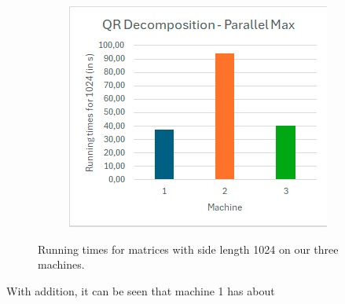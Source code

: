 \begin{figure}[ht]
\begin{subfigure}[b]{0.32\textwidth}
         \label{fig:multiplication diagram}
     \end{subfigure}
     \hfill
     \begin{subfigure}[b]{0.32\textwidth}
         \centering
         \includegraphics[width=\textwidth]{Documents/Report/Figures/QR.png}
         \label{fig:}
     \end{subfigure}
        \caption{Running times for matrices with side length 1024 on our three machines.}
        \label{fig:diagrams for all three algorithms}
\end{figure}

 With addition, it can be seen that machine 1 has about